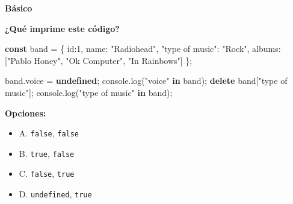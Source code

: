 \documentclass[
  letterpaper,
  DIV=11,
  numbers=noendperiod]{scrreprt}
\newenvironment{Shaded}{\begin{snugshade}}{\end{snugshade}}
\newcommand{\AttributeTok}[1]{\textcolor[rgb]{0.40,0.45,0.13}{#1}}
\newcommand{\BuiltInTok}[1]{\textcolor[rgb]{0.00,0.23,0.31}{#1}}
\newcommand{\DataTypeTok}[1]{\textcolor[rgb]{0.68,0.00,0.00}{#1}}
\newcommand{\DecValTok}[1]{\textcolor[rgb]{0.68,0.00,0.00}{#1}}
\newcommand{\FunctionTok}[1]{\textcolor[rgb]{0.28,0.35,0.67}{#1}}
\newcommand{\KeywordTok}[1]{\textcolor[rgb]{0.00,0.23,0.31}{\textbf{#1}}}
\newcommand{\NormalTok}[1]{\textcolor[rgb]{0.00,0.23,0.31}{#1}}
\newcommand{\OperatorTok}[1]{\textcolor[rgb]{0.37,0.37,0.37}{#1}}
\newcommand{\StringTok}[1]{\textcolor[rgb]{0.13,0.47,0.30}{#1}}
\providecommand{\tightlist}{%
  \setlength{\itemsep}{0pt}\setlength{\parskip}{0pt}}
\begin{document}
\begin{tcolorbox}[enhanced jigsaw, left=2mm, toprule=.15mm, leftrule=.75mm, breakable, colback=white, coltitle=black, bottomtitle=1mm, arc=.35mm, rightrule=.15mm, colframe=quarto-callout-caution-color-frame, opacitybacktitle=0.6, toptitle=1mm, opacityback=0, titlerule=0mm, title=\textcolor{quarto-callout-caution-color}{\faFire}\hspace{0.5em}{Dificultad}, bottomrule=.15mm, colbacktitle=quarto-callout-caution-color!10!white]

\textbf{Básico}

\end{tcolorbox}

\textbf{¿Qué imprime este código?}

\begin{Shaded}
\begin{Highlighting}[]
\KeywordTok{const}\NormalTok{ band }\OperatorTok{=}\NormalTok{ \{}
  \DataTypeTok{id}\OperatorTok{:}\DecValTok{1}\OperatorTok{,}
  \DataTypeTok{name}\OperatorTok{:} \StringTok{"Radiohead"}\OperatorTok{,}
  \StringTok{"type of music"}\OperatorTok{:} \StringTok{"Rock"}\OperatorTok{,}
  \DataTypeTok{albums}\OperatorTok{:}\NormalTok{ [}\StringTok{"Pablo Honey"}\OperatorTok{,} \StringTok{"Ok Computer"}\OperatorTok{,} \StringTok{"In Rainbows"}\NormalTok{]}
\NormalTok{\}}\OperatorTok{;}

\NormalTok{band}\OperatorTok{.}\AttributeTok{voice} \OperatorTok{=} \KeywordTok{undefined}\OperatorTok{;}
\BuiltInTok{console}\OperatorTok{.}\FunctionTok{log}\NormalTok{(}\StringTok{"voice"} \KeywordTok{in}\NormalTok{ band)}\OperatorTok{;}
\KeywordTok{delete}\NormalTok{ band[}\StringTok{"type of music"}\NormalTok{]}\OperatorTok{;}
\BuiltInTok{console}\OperatorTok{.}\FunctionTok{log}\NormalTok{(}\StringTok{"type of music"} \KeywordTok{in}\NormalTok{ band)}\OperatorTok{;}
\end{Highlighting}
\end{Shaded}

\textbf{Opciones:}

\begin{itemize}
\tightlist
\item
  A. \texttt{false}, \texttt{false}
\item
  B. \texttt{true}, \texttt{false}
\item
  C. \texttt{false}, \texttt{true}
\item
  D. \texttt{undefined}, \texttt{true}
\end{itemize}
\end{document}

